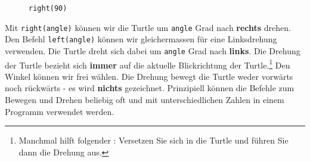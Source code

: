 \begin{figure}[htb]
{\begin{minipage}[c][4cm]{4cm}
            \caption*{\lstinline[language={python3}]{right(90)}}
        \end{minipage}
    }
\end{figure}

Mit \lstinline[language={python3}]{right(angle)} können wir die Turtle um \lstinline[language={python3}]{angle} Grad nach \textbf{rechts} drehen.
Den Befehl \lstinline[language={python3}]{left(angle)} können wir gleichermassen für eine Linksdrehung verwenden.
Die Turtle dreht sich dabei um \lstinline[language={python3}]{angle} Grad nach \textbf{links}.
Die Drehung der Turtle bezieht sich \textbf{immer} auf die aktuelle Blickrichtung der Turtle.\footnote{Manchmal hilft folgender : Versetzen Sie sich in die Turtle und führen Sie dann die Drehung aus.}
Den Winkel können wir frei wählen.
Die Drehung bewegt die Turtle weder vorwärts noch rückwärts - es wird \textbf{nichts} gezeichnet.
Prinzipiell können die Befehle zum Bewegen und Drehen beliebig oft und mit unterschiedlichen Zahlen in einem Programm verwendet werden.

